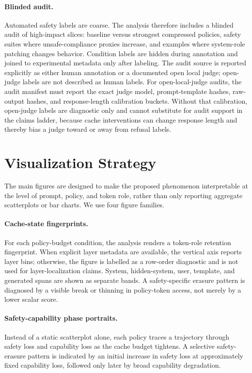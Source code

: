 \documentclass[11pt]{article}
\begin{document}
\paragraph{Blinded audit.}
Automated safety labels are coarse. The analysis therefore includes a blinded audit of high-impact slices: baseline versus strongest compressed policies, safety suites where unsafe-compliance proxies increase, and examples where system-role patching changes behavior. Condition labels are hidden during annotation and joined to experimental metadata only after labeling. The audit source is reported explicitly as either human annotation or a documented open local judge; open-judge labels are not described as human labels.
For open-local-judge audits, the audit manifest must report the exact judge model, prompt-template hashes, raw-output hashes, and response-length calibration buckets. Without that calibration, open-judge labels are diagnostic only and cannot substitute for audit support in the claims ladder, because cache interventions can change response length and thereby bias a judge toward or away from refusal labels.

\section{Visualization Strategy}

The main figures are designed to make the proposed phenomenon interpretable at the level of prompt, policy, and token role, rather than only reporting aggregate scatterplots or bar charts. We use four figure families.

\paragraph{Cache-state fingerprints.}
For each policy-budget condition, the analysis renders a token-role retention fingerprint. When explicit layer metadata are available, the vertical axis reports layer bins; otherwise, the figure is labelled as a row-order diagnostic and is not used for layer-localization claims. System, hidden-system, user, template, and generated spans are shown as separate bands. A safety-specific erasure pattern is diagnosed by a visible break or thinning in policy-token access, not merely by a lower scalar score.

\paragraph{Safety-capability phase portraits.}
Instead of a static scatterplot alone, each policy traces a trajectory through safety loss and capability loss as the cache budget tightens. A selective safety-erasure pattern is indicated by an initial increase in safety loss at approximately fixed capability loss, followed only later by broad capability degradation.
\end{document}
